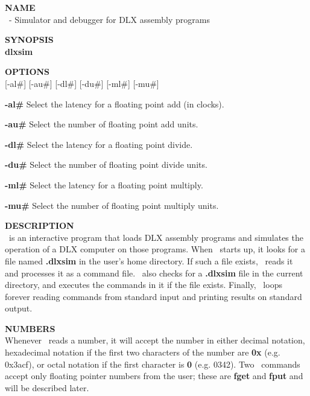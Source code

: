 \begin{mylist}
\item[{\bf NAME}]
\nopagebreak \hfill \\
\dlxsim\ - Simulator and debugger for DLX assembly programs

\item[{\bf SYNOPSIS}]
\nopagebreak \hfill \\
{\bf dlxsim}

\item[{\bf OPTIONS}]
\nopagebreak \hfill \\
{[}-al\#{]} {[}-au\#{]} {[}-dl\#{]} {[}-du\#{]} {[}-ml\#{]} {[}-mu\#{]}
	\begin{mylist}
	\item[{\bf -al\#} \hfill]Select the latency for a floating point add (in clocks).
	\item[{\bf -au\#} \hfill]Select the number of floating point add units.
	\item[{\bf -dl\#} \hfill]Select the latency for a floating point divide.
	\item[{\bf -du\#} \hfill]Select the number of floating point divide units.
	\item[{\bf -ml\#} \hfill]Select the latency for a floating point multiply.
	\item[{\bf -mu\#} \hfill]Select the number of floating point multiply units.
	\end{mylist}

\item[{\bf DESCRIPTION}]
\nopagebreak \hfill \\
\dlxsim\ is an interactive program that loads DLX assembly programs and
simulates the operation of a DLX computer on those programs.  When
\dlxsim\ starts up, it looks for a file named {\bf .dlxsim} in the
user's home directory.  If such a file exists, \dlxsim\ reads it and
processes it as a command file.  \dlxsim\ also checks for a {\bf
.dlxsim} file in the current directory, and executes the commands in
it if the file exists.  Finally, \dlxsim\ loops forever reading commands
from standard input and printing results on standard output.

\item[{\bf NUMBERS}]
\nopagebreak \hfill \\
Whenever \dlxsim\ reads a number, it will accept the number in either
decimal notation, hexadecimal notation if the first two characters of
the number are {\bf 0x} (e.g. 0x3acf), or octal notation if the first
character is {\bf 0} (e.g. 0342).  Two \dlxsim\ commands accept only
floating pointer numbers from the user; these are {\bf fget} and {\bf
fput} and will be described later.


\end{mylist}
